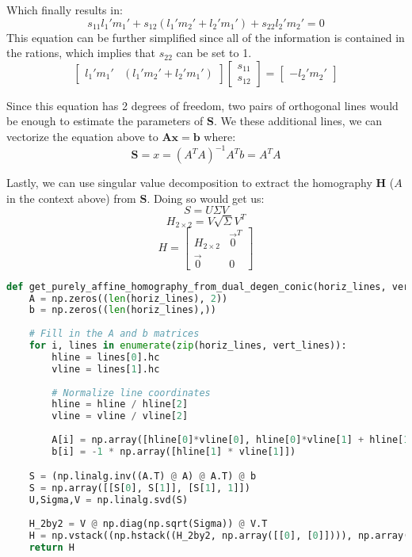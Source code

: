 \documentclass{article}
\begin{document}
Which finally results in:
\[s_{11} l_1 ' m_1 ' + s_{12} ( l_1 ' m_2 ' + l_2 ' m_1 ') + s_{22} l_2 ' m_2' = 0\]
This equation can be further simplified since all of the information is contained in the rations, which implies that $s_{22}$ can be set to 1.
\[\begin{bmatrix}
    l_1 ' m_1 ' & ( l_1 ' m_2 ' + l_2 ' m_1 ')
\end{bmatrix} \begin{bmatrix}
    s_{11} \\ s_{12}
\end{bmatrix} = \begin{bmatrix}
    - l_2 ' m_2'
\end{bmatrix}\]

Since this equation has 2 degrees of freedom, two pairs of orthogonal lines would be enough to estimate the parameters of $\boldsymbol{S}$. We these additional lines, we can vectorize the equation above to $\boldsymbol{A x} = \boldsymbol{b}$ where:
\[\boldsymbol{S} = x = \left(A^TA\right)^{-1} A^Tb = A^TA\]

Lastly, we can use singular value decomposition to extract the homography $\boldsymbol{H}$ ($A$ in the context above) from $\boldsymbol{S}$. Doing so would get us: 
\[S = U \Sigma V\]
\[H_{2\times2} = V \sqrt{\Sigma} V^T\]
\[H = \begin{bmatrix}
    H_{2\times2} & \Vec{0}^T \\
    \Vec{0} & 0
\end{bmatrix}\]

\begin{lstlisting}[language=Python]
def get_purely_affine_homography_from_dual_degen_conic(horiz_lines, vert_lines):
    A = np.zeros((len(horiz_lines), 2))
    b = np.zeros((len(horiz_lines),))
    
    # Fill in the A and b matrices
    for i, lines in enumerate(zip(horiz_lines, vert_lines)):
        hline = lines[0].hc
        vline = lines[1].hc
        
        # Normalize line coordinates
        hline = hline / hline[2]
        vline = vline / vline[2]
        
        A[i] = np.array([hline[0]*vline[0], hline[0]*vline[1] + hline[1]*vline[0]])
        b[i] = -1 * np.array([hline[1] * vline[1]])

    S = (np.linalg.inv((A.T) @ A) @ A.T) @ b
    S = np.array([[S[0], S[1]], [S[1], 1]])
    U,Sigma,V = np.linalg.svd(S)
    
    H_2by2 = V @ np.diag(np.sqrt(Sigma)) @ V.T
    H = np.vstack((np.hstack((H_2by2, np.array([[0], [0]]))), np.array([0, 0, 0])))
    return H
    
\end{lstlisting}
\end{document}
